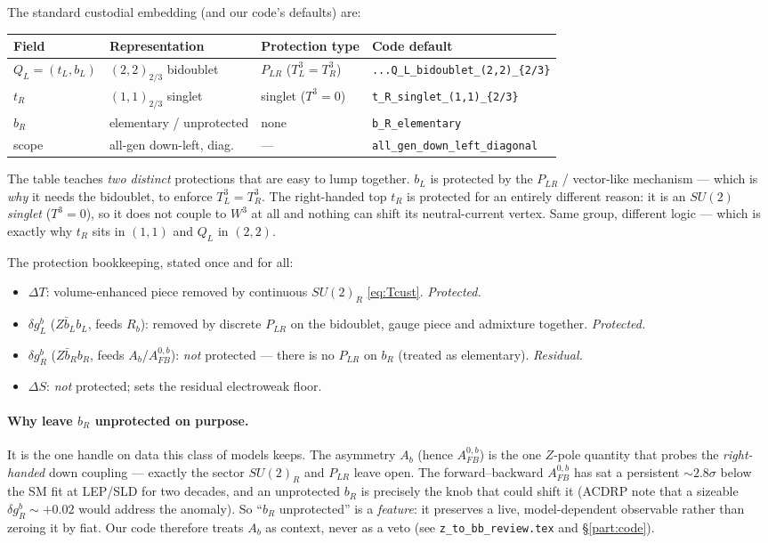 \documentclass[11pt]{article}
\newcommand{\SUR}{SU(2)_R}
\newcommand{\PLR}{P_{LR}}
\newcommand{\code}[1]{\texttt{#1}}
\newcommand{\dgL}{\delta g_L^b}
\newcommand{\dgR}{\delta g_R^b}
\newcommand{\Afb}{A_{FB}^{0,b}}
\theoremstyle{definition}
\begin{document}
The standard custodial embedding (and our code's defaults) are:
\begin{center}
\begin{tabular}{llll}
\toprule
Field & Representation & Protection type & Code default \\
\midrule
$Q_L=(t_L,b_L)$ & $(2,2)_{2/3}$ bidoublet & $\PLR$ ($T^3_L=T^3_R$) & \code{...Q\_L\_bidoublet\_(2,2)\_\{2/3\}} \\
$t_R$ & $(1,1)_{2/3}$ singlet & singlet ($T^3=0$) & \code{t\_R\_singlet\_(1,1)\_\{2/3\}} \\
$b_R$ & elementary / unprotected & none & \code{b\_R\_elementary} \\
scope & all-gen down-left, diag.\ & --- & \code{all\_gen\_down\_left\_diagonal} \\
\bottomrule
\end{tabular}
\end{center}
The table teaches \emph{two distinct} protections that are easy to lump together.
$b_L$ is protected by the $\PLR$ / vector-like mechanism --- which is \emph{why} it
needs the bidoublet, to enforce $T^3_L=T^3_R$. The right-handed top $t_R$ is
protected for an entirely different reason: it is an $SU(2)$ \emph{singlet}
($T^3=0$), so it does not couple to $W^3$ at all and nothing can shift its
neutral-current vertex. Same group, different logic --- which is exactly why $t_R$
sits in $(1,1)$ and $Q_L$ in $(2,2)$.

The protection bookkeeping, stated once and for all:
\begin{itemize}[leftmargin=1.4em]
\item $\Delta T$: volume-enhanced piece removed by continuous $\SUR$
\eqref{eq:Tcust}. \emph{Protected.}
\item $\dgL$ ($Z\bar b_L b_L$, feeds $R_b$): removed by discrete $\PLR$ on the
bidoublet, gauge piece and admixture together. \emph{Protected.}
\item $\dgR$ ($Z\bar b_R b_R$, feeds $A_b$/$\Afb$): \emph{not} protected ---
there is no $\PLR$ on $b_R$ (treated as elementary). \emph{Residual.}
\item $\Delta S$: \emph{not} protected; sets the residual electroweak floor.
\end{itemize}

\paragraph{Why leave $b_R$ unprotected on purpose.} It is the one handle on data
this class of models keeps. The asymmetry $A_b$ (hence $\Afb$) is the one $Z$-pole
quantity that probes the \emph{right-handed} down coupling --- exactly the sector
$\SUR$ and $\PLR$ leave open. The forward--backward $\Afb$ has sat a persistent
$\sim2.8\sigma$ below the SM fit at LEP/SLD for two decades, and an unprotected
$b_R$ is precisely the knob that could shift it (ACDRP note that a sizeable
$\dgR\sim+0.02$ would address the anomaly). So ``$b_R$ unprotected'' is a
\emph{feature}: it preserves a live, model-dependent observable rather than
zeroing it by fiat. Our code therefore treats $A_b$ as context, never as a veto
(see \code{z\_to\_bb\_review.tex} and \S\ref{part:code}).
\end{document}

